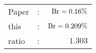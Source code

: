       \begin{tabular}{lcr}
          Paper &:& $\mathrm{Br}  = 0.16\%$ \\
          this      &:& $\mathrm{Br}  = 0.209\%$ \\
		  ratio   &:& $1.303$ \\
      \end{tabular}
